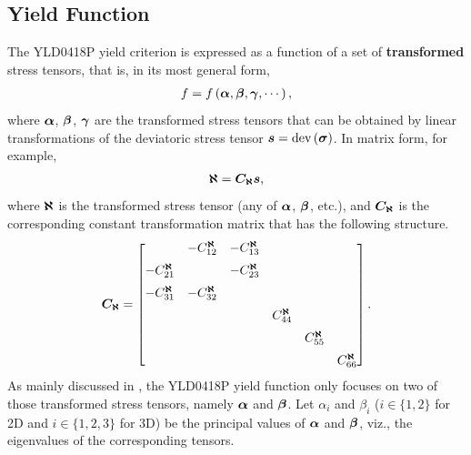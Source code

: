 \subsection{Yield Function}\label{sec:yld0418p_yield_function}
The YLD0418P yield criterion is expressed as a function of a set of \textbf{transformed} stress tensors, that is, in its most general form,
\begin{gather}
    f=f\left(\bm{\alpha},\bm{\beta},\bm{\gamma},\cdots\right),
\end{gather}
where $\bm{\alpha}$, $\bm{\beta}$, $\bm{\gamma}$ are the transformed stress tensors that can be obtained by linear transformations of the deviatoric stress tensor $\bm{s}=\text{dev}\left(\bm{\sigma}\right)$.
In matrix form, for example,
\begin{gather}
    \bm{\aleph}=\bm{C_\aleph}\bm{s},
\end{gather}
where $\bm{\aleph}$ is the transformed stress tensor (any of $\bm{\alpha}$, $\bm{\beta}$, etc.), and $\bm{C_\aleph}$ is the corresponding constant transformation matrix that has the following structure.
\begin{gather}
    \bm{C_\aleph}=
    \begin{bmatrix}
                              & -C^{\bm{\aleph}}_{12} & -C^{\bm{\aleph}}_{13} &                      &                      &                      \\[2mm]
        -C^{\bm{\aleph}}_{21} &                       & -C^{\bm{\aleph}}_{23} &                      &                      &                      \\[2mm]
        -C^{\bm{\aleph}}_{31} & -C^{\bm{\aleph}}_{32} &                       &                      &                      &                      \\[2mm]
                              &                       &                       & C^{\bm{\aleph}}_{44} &                      &                      \\[2mm]
                              &                       &                       &                      & C^{\bm{\aleph}}_{55} &                      \\[2mm]
                              &                       &                       &                      &                      & C^{\bm{\aleph}}_{66}
    \end{bmatrix}.
\end{gather}
As mainly discussed in \cite{Barlat2005}, the YLD0418P yield function only focuses on two of those transformed stress tensors, namely $\bm{\alpha}$ and $\bm{\beta}$.
Let $\alpha_i$ and $\beta_i$ ($i\in\{1,2\}$ for 2D and $i\in\{1,2,3\}$ for 3D) be the principal values of $\bm{\alpha}$ and $\bm{\beta}$, viz., the eigenvalues of the corresponding tensors.
